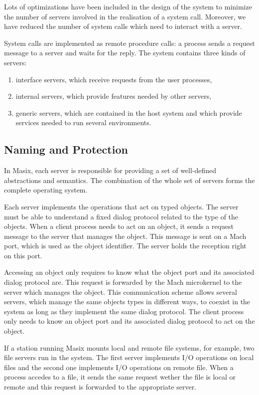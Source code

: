 	Lots of optimizations have been included in the design of the system
to minimize the number of servers involved in the realisation of a system call.
Moreover, we have reduced the number of system calls which need to interact
with a server.

	System calls are implemented as remote procedure calls: a process
sends a request message to a server and waits for the reply. The system
contains three kinds of servers:
\begin {enumerate}
\item interface servers, which receive requests from the user processes,
\item internal servers, which provide features needed by other servers,
\item generic servers, which are contained in the host system and which
provide services needed to run several environments.
\end {enumerate}
	
\subsection {Naming and Protection}

	In Masix, each server is responsible for providing a set of well-defined
abstractions and semantics. The combination of the whole set of servers
forms the complete operating system.

	Each server implements the operations that act on typed objects. The
server must be able to understand a fixed dialog protocol related to the
type of the objects. When a client process needs to act on an object, it sends
a request message to the server that manages the object. This message is sent
on a Mach port, which is used as the object identifier. The server holds the
reception right on this port.

	Accessing an object only requires to know what the object port and its
associated dialog protocol are. This
request is forwarded by the Mach microkernel to the server which manages the
object. This communication scheme allows several servers, which manage the
same objects types in different ways, to coexist in the system as long as
they implement the same dialog protocol. The client process only needs to
know an object port and its associated dialog protocol to act on the object.

	If a station running Masix mounts local and remote file
systems, for example, two file servers run in the system.
The first server implements I/O
operations on local files and the second one implements I/O operations on
remote file. When a process accedes to a file, it sends the same request
wether the
file is local or remote and this request is forwarded to the appropriate
server.

